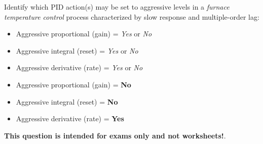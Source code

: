 

Identify which PID action(s) may be set to aggressive levels in a {\it furnace temperature control} process characterized by slow response and multiple-order lag:

\begin{itemize}
\item{} Aggressive proportional (gain) = {\it Yes} or {\it No}
\vskip 10pt
\item{} Aggressive integral (reset) = {\it Yes} or {\it No} 
\vskip 10pt
\item{} Aggressive derivative (rate) = {\it Yes} or {\it No} 
\end{itemize}







\begin{itemize}
\item{} Aggressive proportional (gain) = {\bf No}
\vskip 10pt
\item{} Aggressive integral (reset) = {\bf No} 
\vskip 10pt
\item{} Aggressive derivative (rate) = {\bf Yes} 
\end{itemize}







{\bf This question is intended for exams only and not worksheets!}.


